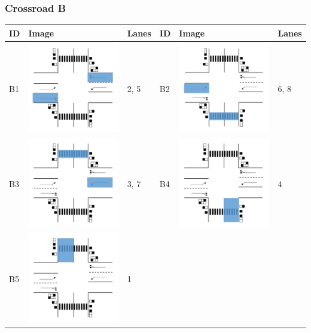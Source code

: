 \subsubsection{Crossroad B}
\begin{tabularx}{\textwidth}{|p{0.6cm}p{4cm}X|p{0.6cm}p{4cm}X|}\hline
	ID & Image & Lanes & ID & Image & Lanes \\\hline
	B1 &  \includegraphics[width=4cm]{figures/CrossroadB1.pdf} & 2, 5 &
	B2 &  \includegraphics[width=4cm]{figures/CrossroadB2.pdf} & 6, 8 \\\hline
	B3 &  \includegraphics[width=4cm]{figures/CrossroadB3.pdf} & 3, 7 &
	B4 &  \includegraphics[width=4cm]{figures/CrossroadB4.pdf} & 4 \\\hline
	B5 &  \includegraphics[width=4cm]{figures/CrossroadB5.pdf} & 1 & & & \\\hline
\end{tabularx}
